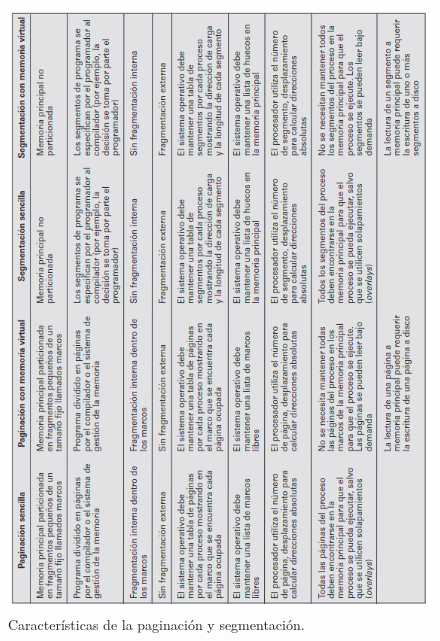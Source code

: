\documentclass[12pt,a4paper]{article}
\begin{document}
\begin{figure}[H]
    \centering
    \includegraphics[width=15cm]{virtual1.png}
    \caption{Características de la paginación y segmentación.}
\end{figure}
\end{document}
